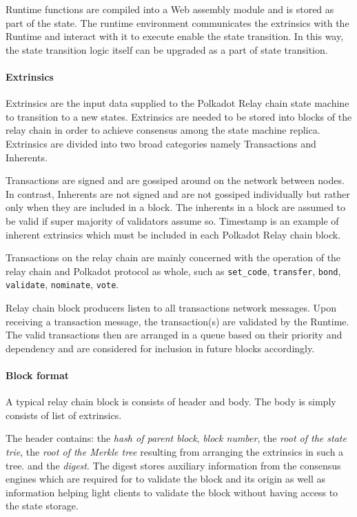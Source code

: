 Runtime functions are compiled into a Web assembly module and is stored as part of the state. The runtime environment communicates the extrinsics with the Runtime and interact with it to execute enable the state transition. In this way, the state transition logic itself can be upgraded as a part of state transition.

\paragraph{Extrinsics}

Extrinsics are the input data supplied to the Polkadot Relay chain state machine to transition to a new states. Extrinsics are needed to be stored into blocks of the relay chain in order to achieve consensus among the state machine replica. Extrinsics are divided into two broad categories namely Transactions and Inherents.

Transactions are signed and are gossiped around on the network between nodes. In contrast, Inherents are not signed and are not gossiped individually but rather only when they are included in a block. The inherents in a block are assumed to be valid if super majority of validators assume so. Timestamp is an example of inherent extrinsics which must be included in each Polkadot Relay chain block.

Transactions on the relay chain are mainly concerned with the operation of the relay chain and Polkadot protocol as whole, such as \texttt{set\_code}, \texttt{transfer}, \texttt{bond}, \texttt{validate}, \texttt{nominate}, \texttt{vote}.

Relay chain block producers listen to all transactions network messages. Upon receiving a transaction message, the transaction(s) are validated by the Runtime. The valid transactions then are arranged in a queue based on their priority and dependency and are considered for inclusion in future blocks accordingly.

\paragraph{Block format}
A typical relay chain block is consists of header and body. The body is simply consists of list of extrinsics.

The header contains: the {\it hash of parent block}, {\it block number}, the {\it root of the state trie}, the {\it root of the Merkle tree} resulting from arranging the extrinsics in such a tree. and the {\it digest}. The digest stores auxiliary information from the consensus engines which are required for to validate the block and its origin as well as information helping light clients to validate the block without having access to the state storage.

